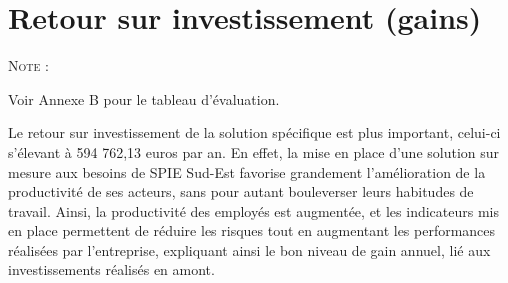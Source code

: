 \begin{figure}[H]
    \noindent{}
\end{figure}

\begin{figure}[H]
    \noindent{}
\end{figure}

\section{Retour sur investissement (gains)}

\begin{shaded}
\noindent\textsc{Note :}

    Voir Annexe B pour le tableau d'évaluation.
\end{shaded}

Le retour sur investissement de la solution spécifique est plus important, celui-ci s’élevant à 594 762,13 euros par an. En effet, la mise en place d’une solution sur mesure aux besoins de SPIE Sud-Est favorise grandement l’amélioration de la productivité de ses acteurs, sans pour autant bouleverser leurs habitudes de travail. Ainsi, la productivité des employés est augmentée, et les indicateurs mis en place permettent de réduire les risques tout en augmentant les performances réalisées par l’entreprise, expliquant ainsi le bon niveau de gain annuel, lié aux investissements réalisés en amont. \\

